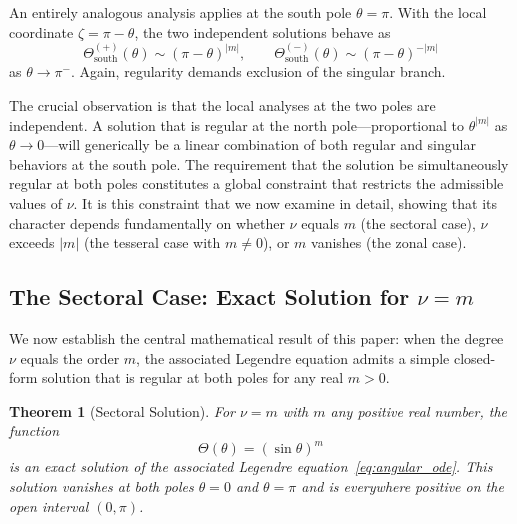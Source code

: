 \documentclass[
  aip,
  amsmath,amssymb,
  preprint
]{revtex4-1}
\newtheorem{theorem}{Theorem}[section]
\begin{document}
An entirely analogous analysis applies at the south pole $\theta = \pi$. With the local coordinate $\zeta = \pi - \theta$, the two independent solutions behave as
\begin{equation}
\Theta^{(+)}_{\text{south}}(\theta) \sim (\pi-\theta)^{|m|}, \qquad \Theta^{(-)}_{\text{south}}(\theta) \sim (\pi-\theta)^{-|m|}
\label{eq:south_pole_behavior}
\end{equation}
as $\theta \to \pi^-$. Again, regularity demands exclusion of the singular branch.

The crucial observation is that the local analyses at the two poles are independent. A solution that is regular at the north pole---proportional to $\theta^{|m|}$ as $\theta \to 0$---will generically be a linear combination of both regular and singular behaviors at the south pole. The requirement that the solution be simultaneously regular at both poles constitutes a global constraint that restricts the admissible values of $\nu$. It is this constraint that we now examine in detail, showing that its character depends fundamentally on whether $\nu$ equals $m$ (the sectoral case), $\nu$ exceeds $|m|$ (the tesseral case with $m \neq 0$), or $m$ vanishes (the zonal case).


\subsection{The Sectoral Case: Exact Solution for $\nu = m$}


We now establish the central mathematical result of this paper: when the degree $\nu$ equals the order $m$, the associated Legendre equation admits a simple closed-form solution that is regular at both poles for any real $m > 0$.

\begin{theorem}[Sectoral Solution]
\label{thm:sectoral}
For $\nu = m$ with $m$ any positive real number, the function
\begin{equation}
\Theta(\theta) = (\sin\theta)^m
\label{eq:sectoral_solution}
\end{equation}
is an exact solution of the associated Legendre equation~\eqref{eq:angular_ode}. This solution vanishes at both poles $\theta = 0$ and $\theta = \pi$ and is everywhere positive on the open interval $(0, \pi)$.
\end{theorem}
\end{document}
